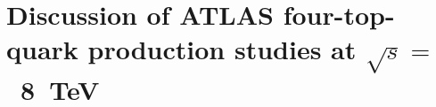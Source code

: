 \section{Discussion of ATLAS four-top-quark production studies at $\sqrt{s} =$~8~TeV}
\label{sec:ATLASresult}




